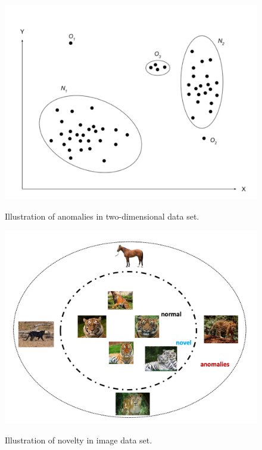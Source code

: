 \begin{figure}
  \centering
  \begin{minipage}{.48\linewidth}
    \centering
      {\includegraphics[scale=0.35]{images/anomalies.png}}
    \caption{Illustration of anomalies in two-dimensional data set.}
    \label{fig:anomalies}
  \end{minipage}\quad
  \begin{minipage}{.48\linewidth}
    \centering
      {\includegraphics[scale=0.35]{images/novel.png}}
    \caption{Illustration of novelty in image data set.}
    \label{fig:novelties}
  \end{minipage}
  \bigskip

\end{figure}


